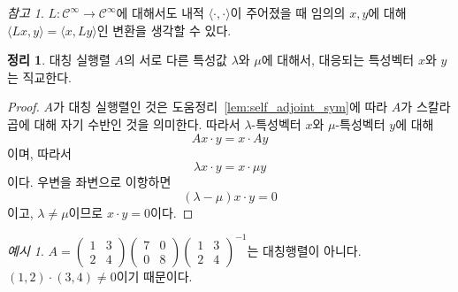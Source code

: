 \documentclass[unfonts,oneside,a4paper]{oblivoir}
\theoremstyle{definition}
\theoremstyle{theorem}
\newtheorem{theorem}[definition]{정리}
\theoremstyle{theorem}
\theoremstyle{remark}
\newtheorem*{remark}{참고}
\theoremstyle{remark}
\theoremstyle{remark}
\newtheorem*{example}{예시}
\theoremstyle{remark}
\renewcommand{\vec}[1]{\bm{\mathit{#1}}}
\begin{document}
\begin{remark}
    $L: \mathcal C^\infty \rightarrow \mathcal C^\infty$에 대해서도 내적 $\langle \cdot, \cdot \rangle$이 주어졌을 때 임의의 $x, y$에 대해 $\langle L x, y \rangle = \langle x, Ly \rangle$인 변환을 생각할 수 있다.
\end{remark}

\begin{theorem} \label{thm:sym_eigenvector_orthogonal}
    대칭 실행렬 $A$의 서로 다른 특성값 $\lambda$와 $\mu$에 대해서, 대응되는 특성벡터 $\vec x$와 $\vec y$는 직교한다.
\end{theorem}

\begin{proof}
    $A$가 대칭 실행렬인 것은 도움정리~\ref{lem:self_adjoint_sym}에 따라 $A$가 스칼라곱에 대해 자기 수반인 것을 의미한다.
    따라서 $\lambda$-특성벡터 $\vec x$와 $\mu$-특성벡터 $\vec y$에 대해
    \begin{equation*}
        A \vec x \cdot \vec y = \vec x \cdot A \vec y
    \end{equation*}
    이며, 따라서
    \begin{equation*}
        \lambda \vec x \cdot \vec y = \vec x \cdot \mu \vec y
    \end{equation*}
    이다.
    우변을 좌변으로 이항하면
    \begin{equation*}
        (\lambda - \mu) \vec x \cdot \vec y = 0
    \end{equation*}
    이고, $\lambda \neq \mu$이므로 $\vec x \cdot \vec y = 0$이다.
\end{proof}

\begin{example}
    $A = \begin{pmatrix}1 & 3\\2 & 4\end{pmatrix} \begin{pmatrix}7 & 0\\ 0 & 8\end{pmatrix}\begin{pmatrix}1 & 3\\2 & 4\end{pmatrix}^{-1}$는 대칭행렬이 아니다.
    $(1, 2) \cdot (3, 4) \neq 0$이기 때문이다.
\end{example}
\end{document}
